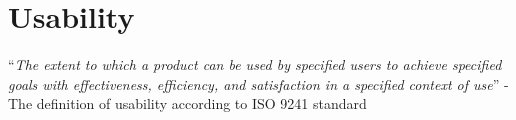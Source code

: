 \chapter{Usability}
 

 
\begin{center}
	
``\textit{The extent to which a product can be used by specified users to achieve specified goals with effectiveness, efficiency, and satisfaction in a specified context of use}” -The definition of usability according to ISO 9241 standard
\end{center}

